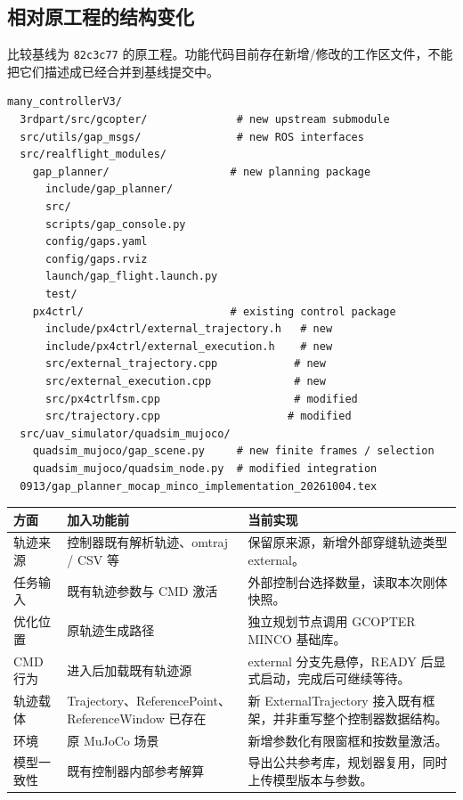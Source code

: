\documentclass[UTF8,fontset=fandol,a4paper,10pt]{ctexart}
\newcommand{\code}[1]{{\small\nolinkurl{#1}}}
\begin{document}
\subsection{相对原工程的结构变化}
比较基线为 \code{82c3c77} 的原工程。功能代码目前存在新增/修改的工作区文件，不能把它们描述成已经合并到基线提交中。
\begin{lstlisting}
many_controllerV3/
  3rdpart/src/gcopter/              # new upstream submodule
  src/utils/gap_msgs/               # new ROS interfaces
  src/realflight_modules/
    gap_planner/                   # new planning package
      include/gap_planner/
      src/
      scripts/gap_console.py
      config/gaps.yaml
      config/gaps.rviz
      launch/gap_flight.launch.py
      test/
    px4ctrl/                       # existing control package
      include/px4ctrl/external_trajectory.h   # new
      include/px4ctrl/external_execution.h    # new
      src/external_trajectory.cpp            # new
      src/external_execution.cpp             # new
      src/px4ctrlfsm.cpp                     # modified
      src/trajectory.cpp                    # modified
  src/uav_simulator/quadsim_mujoco/
    quadsim_mujoco/gap_scene.py     # new finite frames / selection
    quadsim_mujoco/quadsim_node.py  # modified integration
  0913/gap_planner_mocap_minco_implementation_20261004.tex
\end{lstlisting}

\noindent\begin{tabularx}{\linewidth}{@{}p{25mm}YY@{}}\toprule
方面 & 加入功能前 & 当前实现\\\midrule
轨迹来源 & 控制器既有解析轨迹、omtraj / CSV 等 & 保留原来源，新增外部穿缝轨迹类型 external。\\
任务输入 & 既有轨迹参数与 CMD 激活 & 外部控制台选择数量，读取本次刚体快照。\\
优化位置 & 原轨迹生成路径 & 独立规划节点调用 GCOPTER MINCO 基础库。\\
CMD 行为 & 进入后加载既有轨迹源 & external 分支先悬停，READY 后显式启动，完成后可继续等待。\\
轨迹载体 & Trajectory、ReferencePoint、ReferenceWindow 已存在 & 新 ExternalTrajectory 接入既有框架，并非重写整个控制器数据结构。\\
环境 & 原 MuJoCo 场景 & 新增参数化有限窗框和按数量激活。\\
模型一致性 & 既有控制器内部参考解算 & 导出公共参考库，规划器复用，同时上传模型版本与参数。\\\bottomrule
\end{tabularx}
\end{document}
